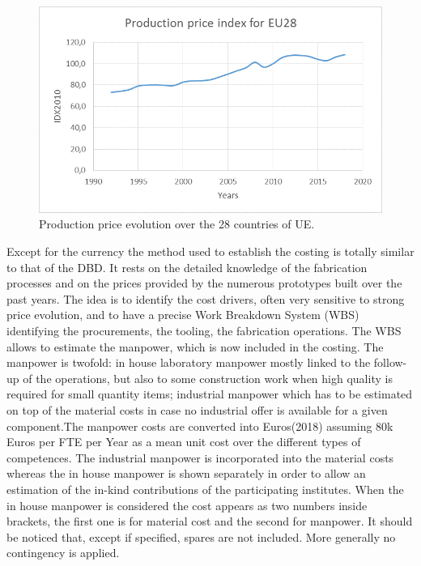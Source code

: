 \begin{figure}[h!]
\centering
\includegraphics[width=1.0\hsize]{Costing/price_index.png}
\caption{Production price evolution over the 28 countries of UE.}
\label{price_index}
\end{figure}

Except for the currency the method used to establish the costing is totally similar to that of the DBD. It rests on the detailed knowledge of the fabrication processes and on the prices provided by the numerous prototypes built over the past years.  The idea is to identify the cost drivers, often very sensitive to strong price evolution, and to have a precise Work Breakdown System (WBS) identifying the procurements, the tooling, the fabrication operations. The WBS allows to estimate the manpower, which is now included in the costing. The manpower is twofold: in house laboratory  manpower mostly linked to the follow-up of the operations, but also to some construction work when high quality is required for small quantity items; industrial manpower which has to be estimated on top of the material costs in case no industrial offer is available for a given component.The manpower costs are converted into Euros(2018) assuming 80k Euros per FTE per Year as a mean unit cost over the different types of competences. The industrial manpower is incorporated into the material costs whereas the in house manpower is shown separately in order to allow an estimation of the in-kind contributions of the participating institutes. When the in house manpower is considered the cost appears as two numbers inside brackets, the first one is for material cost and the second for manpower.
It should be noticed that, except if specified, spares  are not included. More generally no contingency is applied.

